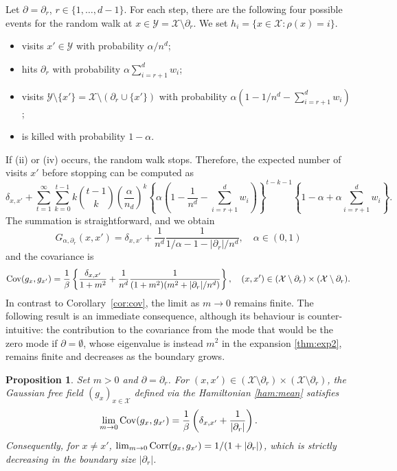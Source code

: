 \documentclass[a4paper,11pt]{article}
\theoremstyle{plain}
\newtheorem{proposition}[theorem]{Proposition}
\theoremstyle{definition}
\begin{document}
Let $\partial=\partial_r$, $r\in\{1,\ldots,d-1\}$.
For each step, there are the following four
possible events for the random walk at
$x\in\mathcal{Y}=\mathcal{X}\setminus\partial_r$.
We set $h_i=\{x\in\mathcal{X}:\rho(x)=i\}$.
\begin{itemize}
\item[(i)] visits $x'\in\mathcal{Y}$ with probability $\alpha/n^d$;
\item[(ii)] hits $\partial_r$ with probability
  $\alpha\sum_{i=r+1}^d w_i$;
\item[(iii)] visits
  $\mathcal{Y}\setminus\{x'\}=\mathcal{X}\setminus(\partial_r\cup\{x'\})$
  with probability
  $\alpha(1-1/n^d-\sum_{i=r+1}^dw_i)$;
\item[(iv)] is killed with probability $1-\alpha$.
\end{itemize}
If (ii) or (iv) occurs, the random walk stops.
Therefore, the expected number of visits $x'$
before stopping can be computed as
\begin{equation*}
  \delta_{x,x'}+
  \sum_{t=1}^\infty\sum_{k=0}^{t-1}
  k{t-1\choose k}\left(\frac{\alpha}{n_d}\right)^k
  \left\{\alpha
  \left(1-\frac{1}{n^d}-\sum_{i=r+1}^dw_i\right)\right\}^{t-k-1}
  \left\{1-\alpha+\alpha\sum_{i=r+1}^dw_i\right\}.
\end{equation*}
The summation is straightforward, and we obtain
\[
  G_{\alpha,\partial_r}(x,x')=\delta_{x,x'}
  +\frac{1}{n^d}\frac{1}{1/\alpha-1-|\partial_r|/n^d},
  \quad \alpha\in(0,1)
\]
and the covariance is
\begin{equation*}
  {\rm Cov}(g_x,g_{x'})
  =\frac{1}{\beta}\left\{\frac{\delta_{x,x'}}{1+m^2}
  +\frac{1}{n^d}\frac{1}{(1+m^2)(m^2+|\partial_r|/n^d)}
  \right\}, \quad (x,x')\in(\mathcal{X}\setminus\partial_r)
  \times(\mathcal{X}\setminus\partial_r).
\end{equation*}
In contrast to Corollary~\ref{cor:cov}, the limit as
$m\to 0$ remains finite. The following result is
an immediate consequence, although its behaviour is
counter-intuitive: the contribution to the covariance
from the mode that would be the zero mode if
$\partial=\emptyset$, whose eigenvalue is instead $m^2$
in the expansion \eqref{thm:exp2}, remains finite and
decreases as the boundary grows.

\begin{proposition}
  Set $m>0$ and $\partial=\partial_r$. For
  $(x,x')\in(\mathcal{X}\setminus\partial_r)\times(\mathcal{X}\setminus\partial_r)$, the Gaussian free
  field $(g_x)_{x\in\mathcal{X}}$ defined via the
  Hamiltonian \eqref{ham:mean} satisfies
  \begin{equation}\label{cov_indb}
  \lim_{m\to 0}{\rm Cov}(g_x,g_{x'})
  =\frac{1}{\beta}\left(\delta_{x,x'}+\frac{1}{|\partial_r|}\right).
  \end{equation}
  Consequently, for $x\neq x'$,
  $\lim_{m\to 0}{\rm Corr}(g_x,g_{x'})=1/(1+|\partial_r|)$,
  which is strictly decreasing in the boundary size $|\partial_r|$.
\end{proposition}
\end{document}
